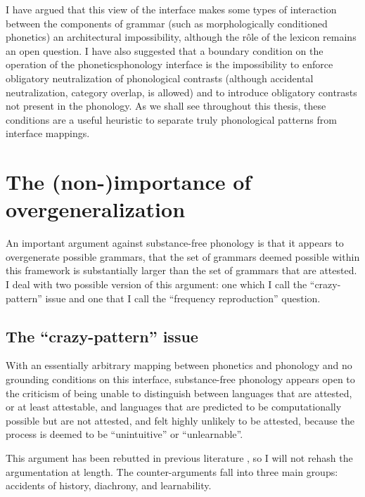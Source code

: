 I have argued that this view of the interface makes some types of interaction between the components of grammar (such as morphologically conditioned phonetics) an architectural impossibility, although the rôle of the lexicon remains an open question. I have also suggested that a boundary condition on the operation of the phonetics\endash phonology interface is the impossibility to enforce obligatory neutralization of phonological contrasts (although accidental neutralization, \ie category overlap, is allowed) and to introduce obligatory contrasts not present in the phonology. As we shall see throughout this thesis, these conditions are a useful heuristic to separate truly phonological patterns from interface mappings.

\section{The (non-)importance of overgeneralization}
\label{sec:non--importance}

An important argument against substance\hyp free phonology is that it appears to overgenerate possible grammars, \ie that the set of grammars deemed possible within this framework is substantially larger than the set of grammars that are attested. I deal with two possible version of this argument: one which I call the \enquote{crazy\hyp pattern} issue and one that I call the \enquote{frequency reproduction} question.

\subsection{The \enquote{crazy\hyp pattern} issue}
\label{sec:enqu-patt-issue}

With an essentially arbitrary mapping between phonetics and phonology and no grounding conditions on this interface, substance\hyp free phonology appears open to the criticism of being unable to distinguish between languages that are attested, or at least attestable, and languages that are predicted to be computationally possible but are not attested, and felt highly unlikely to be attested, because the process is deemed to be \enquote{unintuitive} or \enquote{unlearnable}.

This argument has been rebutted in previous literature \citep{hale-kissock-reiss,reiss07:_modul,hale-reiss2008,blaho-diss}, so I will not rehash the argumentation at length. The counter\hyp arguments fall into three main groups: accidents of history, diachrony, and learnability.

